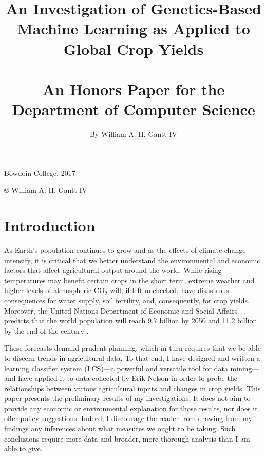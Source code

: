 \documentclass[12pt,twoside]{article}
\begin{document}
\title{An Investigation of Genetics-Based Machine Learning as Applied to Global Crop Yields \\
\quad \\
\large An Honors Paper for the Department of Computer Science}
\author{By William A. H. Gantt IV}
\date{}
\maketitle
\vfill
\begin{center}
Bowdoin College, 2017

\copyright{ William A. H. Gantt IV }
\end{center}
\clearpage
\tableofcontents
\listofalgorithms
\listoffigures
\listoftables
\clearpage
\section{Introduction}

As Earth's population continues to grow and as the effects of climate change intensify, it is critical that we better understand the environmental and economic factors that affect agricultural output around the world. While rising temperatures may benefit certain crops in the short term, extreme weather and higher levels of atmospheric $\text{CO}_2$ will, if left unchecked, have disastrous consequences for water supply, soil fertility, and, consequently, for crop yields. \cite{us_epa_climate_2017}. Moreover, the United Nations Department of Economic and Social Affairs predicts that the world population will reach 9.7 billion by 2050 and 11.2 billion by the end of the century \cite{noauthor_world_2015}.

These forecasts demand prudent planning, which in turn requires that we be able to discern trends in agricultural data. To that end, I have designed and written a learning classifier system (LCS)---a powerful and versatile tool  for data mining---and have applied it to data collected by Erik Nelson in order to probe the relationships between various agricultural inputs and changes in crop yields.
This paper presents the preliminary results of my investigations. It does not aim to provide any economic or environmental explanation for those results, nor does it offer policy suggestions. Indeed, I discourage the reader from drawing from my findings any inferences about what measures we ought to be taking. Such conclusions require more data and broader, more thorough analysis than I am able to give.
\end{document}
